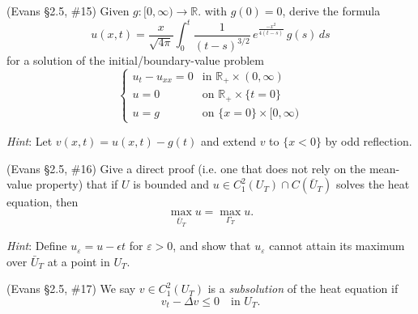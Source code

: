 \documentclass[12pt,fleqn,leqno]{exam}
\newcommand{\R}{\ensuremath{\mathbb{R}}}
\begin{document}
\begin{questions}
\question (Evans \S2.5, \#15) Given $g : [0,\infty) \rightarrow \R$. with $g(0) = 0$, derive the formula
\[u(x,t) = \frac{x}{\sqrt{4\pi}} \int_0^t \frac{1}{(t-s)^{3/2}}\,e^{\frac{-x^2}{4(t-s)}}\,g(s)\,ds\]
for a solution of the initial/boundary-value problem
\[\begin{cases}
u_t - u_{xx} = 0 & \text{in } \R_+ \times (0,\infty) \\
u = 0 & \text{on } \R_+ \times \{t = 0\} \\
u = g & \text{on } \{x = 0\} \times [0,\infty)
\end{cases}\]

\emph{Hint}: Let $v(x,t) = u(x,t) - g(t)$ and extend $v$ to $\{x < 0\}$ by odd reflection.

\question (Evans \S2.5, \#16) Give a direct proof (i.e. one that does not rely on the mean-value property) that if $U$ is bounded and $u \in C_1^2(U_T) \cap C(\bar{U}_T)$ solves the heat equation, then
\[\max_{\bar{U}_T} u = \max_{\Gamma_T} u.\]

\emph{Hint}: Define $u_\varepsilon = u - \epsilon t$ for $\varepsilon > 0$, and show that $u_\varepsilon$ cannot attain its maximum over $\bar{U}_T$ at a point in $U_T$.

\question (Evans \S2.5, \#17) We say $v \in C_1^2(U_T)$ is a \emph{subsolution} of the heat equation if
\[v_t - \Delta v \leq 0\quad \text{in } U_T.\]


\end{questions}
\end{document}
